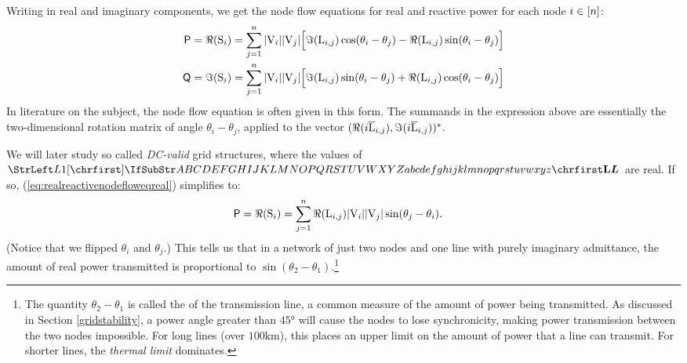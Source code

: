 \documentclass[main.tex]{subfiles}
\begin{document}
\begin{remark}
Writing in real and imaginary components, we get the node flow equations for real and reactive power for each node $i \in [n]$:
\begin{align}
    \mathsf{P}=\Re ({\mathrm{S}}_i) &= \sum_{j=1}^{n} |{\mathrm{V}}_i| |{\mathrm{V}}_{j}| \Big[\Im({\mathrm{L}}_{i,j})\cos(\theta_i - \theta_j)-\Re({\mathrm{L}}_{i,j})\sin(\theta_i - \theta_j)\Big]
    \label{eq:realreactivenodefloweqreal}
    \\
    \mathsf{Q}=\Im ({\mathrm{S}}_i) &= \sum_{j=1}^{n} |{\mathrm{V}}_i| |{\mathrm{V}}_{j}|\Big[\Im({\mathrm{L}}_{i,j})\sin(\theta_i - \theta_j)+\Re({\mathrm{L}}_{i,j})\cos(\theta_i - \theta_j)\Big]
    \label{eq:realreactivenodefloweqreactive}
\end{align}
In literature on the subject, the node flow equation is often given in this form. The summands in the expression above are essentially the two-dimensional rotation matrix of angle $\theta_i - \theta_j$, applied to the vector $(\Re(i \overline{{\mathrm{L}}}_{i,j}), \Im(i \overline{{\mathrm{L}}}_{i,j}))^*$.

We will later study so called \emph{DC-valid} grid structures, where the values of $\mat{L}$ are real. If so, (\ref{eq:realreactivenodefloweqreal}) simplifies to:
\begin{align*}
    \mathsf{P}=\Re ({\mathrm{S}}_i) &= \sum_{j=1}^{n} \Re({\mathrm{L}}_{i,j}) |{\mathrm{V}}_i| |{\mathrm{V}}_{j}| \sin(\theta_j - \theta_i).
\end{align*}
(Notice that we flipped $\theta_i$ and $\theta_j$.)
This tells us that in a network of just two nodes and one line with purely imaginary admittance,  the amount of real power transmitted is proportional to $\sin (\theta_2-\theta_1)$.\footnote{The quantity $\theta_2 - \theta_1$ is called the  of the transmission line, a common measure of the amount of power being transmitted. As discussed in Section \ref{gridstability}, a power angle greater than $45\si{\degree}$ will cause the nodes to lose synchronicity, making power transmission between the two nodes impossible. For long lines (over $100\si{\kilo\meter}$), this  places an upper limit on the amount of power that a line can transmit. For shorter lines, the \emph{thermal limit} dominates.}


\end{remark}
\end{document}
